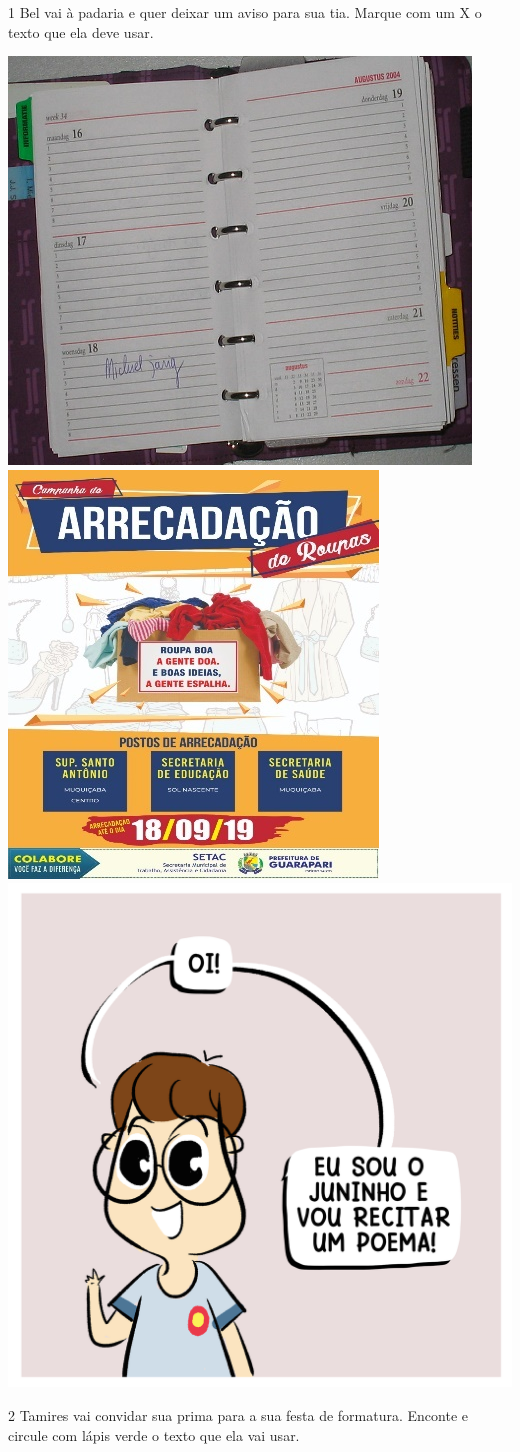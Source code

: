 

\num{1} Bel vai à padaria e quer deixar um aviso para sua tia. 
Marque com um X o texto que ela deve usar.


\includegraphics[width=.3\textwidth]{media/image93.jpeg}
\includegraphics[width=.3\textwidth]{media/image94.jpeg}
\includegraphics[width=.3\textwidth]{media/image97.png}



\pagebreak

\num{2} Tamires vai convidar sua prima para a sua festa de formatura. 
Enconte e circule com lápis verde o texto que ela vai usar. 

